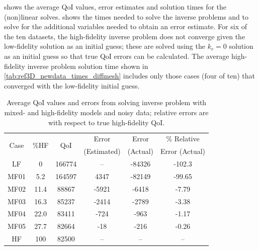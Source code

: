 \documentclass[review]{siamart0516}
\begin{document}
 shows the average QoI values, error estimates and solution times for the (non)linear solves.  shows the times needed to solve the inverse problems and to solve for the additional variables needed to obtain an error estimate. For six of the ten datasets, the high-fidelity inverse problem does not converge given the low-fidelity solution as an initial guess; these are solved using the $k_r=0$ solution as an initial guess so that true QoI errors can be calculated. The average high-fidelity inverse problem solution time shown in \cref{tab:ref3D_newdata_times_diffmesh} includes only those cases (four of ten) that converged with the low-fidelity initial guess.
%
\begin{table}
\caption{Average QoI values and errors from solving inverse problem with mixed- and high-fidelity models and noisy data; relative errors are with respect to true high-fidelity QoI.}
\label{tab:ref3D_newdata_QoI_diffmesh}
\centering
\begin{tabular}{|c|c|c|c|c|c|}
\hline
\multirow{2}{*}{Case} & \multirow{2}{*}{$\%$HF} & \multirow{2}{*}{QoI} & Error & Error & $\%$ Relative  \\
& & & (Estimated) & (Actual) & Error (Actual) \\ \hline
LF   & 0    & 166774 & --    & -84326 & -102.3 \\
MF01 & 5.2  & 164597 & 4347  & -82149 & -99.65  \\
MF02 & 11.4 & 88867  & -5921 & -6418  & -7.79  \\
MF03 & 16.3 & 85237  & -2414 & -2789  & -3.38  \\
MF04 & 22.0 & 83411  & -724  & -963   & -1.17  \\
MF05 & 27.7 & 82664  & -18   & -216   & -0.26 \\
HF   & 100  & 82500  & --    & --     & --  \\ \hline
\end{tabular}
\end{table}
\end{document}
